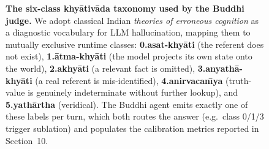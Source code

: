 \begin{figure}[!tbp]
{}
\caption{\textbf{The six-class khy\=ativ\=ada taxonomy used by the Buddhi judge.}
We adopt classical Indian \emph{theories of erroneous cognition} as a
diagnostic vocabulary for LLM hallucination, mapping them to mutually
exclusive runtime classes:
\textbf{0.\;asat-khy\=ati} (the referent does not exist),
\textbf{1.\;\=atma-khy\=ati} (the model projects its own state onto the
world), \textbf{2.\;akhy\=ati} (a relevant fact is omitted),
\textbf{3.\;anyath\=a-khy\=ati} (a real referent is mis-identified),
\textbf{4.\;anirvacan\=\i ya} (truth-value is genuinely indeterminate
without further lookup), and \textbf{5.\;yath\=artha} (veridical).
The Buddhi agent emits exactly one of these labels per turn, which
both routes the answer (e.g.\ class 0/1/3 trigger sublation) and
populates the calibration metrics reported in Section~10.}
\label{fig:khyati}
\end{figure}
